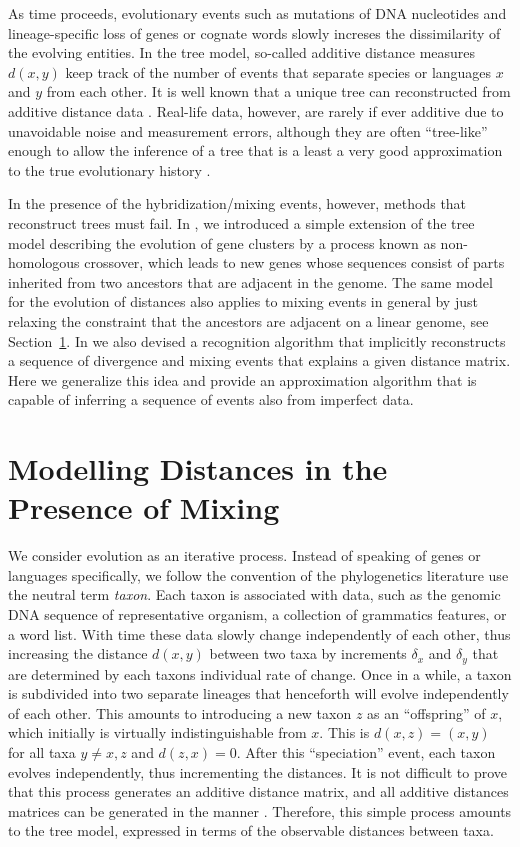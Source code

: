 \documentclass[amsmath]{lni}
\begin{document}
As time proceeds, evolutionary events such as mutations of DNA nucleotides
and lineage-specific loss of genes or cognate words slowly increses the
dissimilarity of the evolving entities. In the tree model, so-called
additive distance measures $d(x,y)$ keep track of the number of events that
separate species or languages $x$ and $y$ from each other.  It is well
known that a unique tree can reconstructed from additive distance data
\cite{SimoesPereira:69}. Real-life data, however, are rarely if ever
additive due to unavoidable noise and measurement errors, although they are
often ``tree-like'' enough to allow the inference of a tree that is a least
a very good approximation to the true evolutionary history
\cite{Atteson:99}.

In the presence of the hybridization/mixing events, however, methods that
reconstruct trees must fail. In \cite{Prohaska:17a}, we introduced a simple
extension of the tree model describing the evolution of gene clusters by a
process known as non-homologous crossover, which leads to new genes whose
sequences consist of parts inherited from two ancestors that are adjacent
in the genome. The same model for the evolution of distances also applies
to mixing events in general by just relaxing the constraint that the
ancestors are adjacent on a linear genome, see Section~\ref{sect:R}. In
\cite{Prohaska:17a} we also devised a recognition algorithm that implicitly
reconstructs a sequence of divergence and mixing events that explains a
given distance matrix. Here we generalize this idea and provide an
approximation algorithm that is capable of inferring a sequence of events
also from imperfect data.

\section{Modelling Distances in the Presence of Mixing} 
\label{sect:R}

We consider evolution as an iterative process. Instead of speaking of genes
or languages specifically, we follow the convention of the phylogenetics
literature use the neutral term \emph{taxon}. Each taxon is associated with
data, such as the genomic DNA sequence of representative organism, a
collection of grammatics features, or a word list. With time these data
slowly change independently of each other, thus increasing the distance
$d(x,y)$ between two taxa by increments $\delta_x$ and $\delta_y$ that are
determined by each taxons individual rate of change. Once in a while, a
taxon is subdivided into two separate lineages that henceforth will evolve
independently of each other. This amounts to introducing a new taxon $z$ as
an ``offspring'' of $x$, which initially is virtually indistinguishable
from $x$. This is $d(x,z)=(x,y)$ for all taxa $y\ne x,z$ and $d(z,x)=0$.
After this ``speciation'' event, each taxon evolves independently, thus
incrementing the distances. It is not difficult to prove that this process
generates an additive distance matrix, and all additive distances matrices
can be generated in the manner \cite{Prohaska:17a}. Therefore, this simple
process amounts to the tree model, expressed in terms of the observable
distances between taxa.
\end{document}
